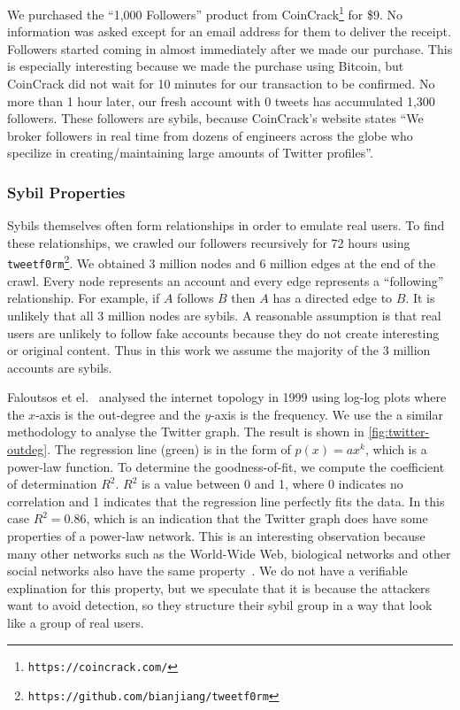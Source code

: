 We purchased the ``1,000 Followers'' product from
CoinCrack\footnote{\texttt{https://coincrack.com/}} for \$9. No information was
asked except for an email address for them to deliver the receipt. Followers
started coming in almost immediately after we made our purchase. This is
especially interesting because we made the purchase using Bitcoin, but CoinCrack
did not wait for 10 minutes for our transaction to be confirmed. No more than 1
hour later, our fresh account with 0 tweets has accumulated 1,300 followers.
These followers are sybils, because CoinCrack's website states ``We broker
followers in real time from dozens of engineers across the globe who specilize
in creating/maintaining large amounts of Twitter profiles''.

\subsubsection{Sybil Properties}
Sybils themselves often form relationships in order to emulate real users. To
find these relationships, we crawled our followers recursively for 72 hours
using
\verb!tweetf0rm!\footnote{\texttt{https://github.com/bianjiang/tweetf0rm}}. We
obtained 3 million nodes and 6 million edges at the end of the crawl. Every node
represents an account and every edge represents a ``following'' relationship.
For example, if $A$ follows $B$ then $A$ has a directed edge to $B$. It is
unlikely that all 3 million nodes are sybils. A reasonable assumption is that
real users are unlikely to follow fake accounts because they do not create
interesting or original content. Thus in this work we assume the majority of the
3 million accounts are sybils.

Faloutsos et el.~\cite{faloutsos1999power} analysed the internet topology in
1999 using log-log plots where the $x$-axis is the out-degree and the $y$-axis
is the frequency. We use the a similar methodology to analyse the Twitter graph.
The result is shown in \autoref{fig:twitter-outdeg}. The regression line (green)
is in the form of $p(x) = ax^k$, which is a power-law function. To determine the
goodness-of-fit, we compute the coefficient of determination $R^2$. $R^2$ is a
value between 0 and 1, where 0 indicates no correlation and 1 indicates that the
regression line perfectly fits the data. In this case $R^2 = 0.86$, which is an
indication that the Twitter graph does have some properties of a power-law
network. This is an interesting observation because many other networks such as
the World-Wide Web, biological networks and other social networks also have the
same property~\cite{faloutsos1999power, girvan2002community}. We do not have a
verifiable explination for this property, but we speculate that it is because
the attackers want to avoid detection, so they structure their sybil group in a
way that look like a group of real users.


